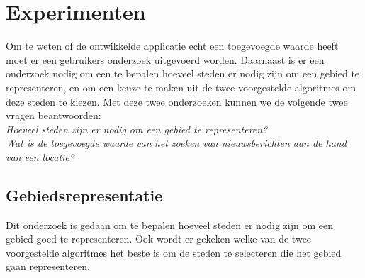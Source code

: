 \documentclass[twoside,openright]{uva-bachelor-thesis}
\begin{document}
\chapter{Experimenten}
	Om te weten of de ontwikkelde applicatie echt een toegevoegde waarde heeft moet er een gebruikers onderzoek uitgevoerd worden. Daarnaast is er een onderzoek nodig om een te bepalen hoeveel steden er nodig zijn om een gebied te representeren, en om een keuze te maken uit de twee voorgestelde algoritmes om deze steden te kiezen. Met deze twee onderzoeken kunnen we de volgende twee vragen beantwoorden:\\[0.5cm]
	\indent \textit{Hoeveel steden zijn er nodig om een gebied te representeren?}
	\\[0.2cm]
	\indent \textit{Wat is de toegevoegde waarde van het zoeken van nieuwsberichten aan de hand van een locatie?}
	\section{Gebiedsrepresentatie}
	\label{sec:numcities}
		Dit onderzoek is gedaan om te bepalen hoeveel steden er nodig zijn om een gebied goed te representeren. Ook wordt er gekeken welke van de twee voorgestelde algoritmes het beste is om de steden te selecteren die het gebied gaan representeren.
\end{document}
